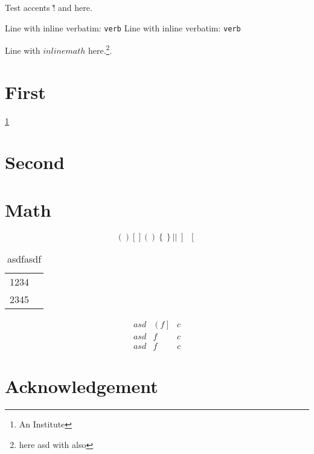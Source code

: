 \documentclass{article}
\begin{document}
Test accents \v! and \v@ here.

Line with inline verbatim: \verb+verb+
Line with inline verbatim: \verb*+verb+

Line with $inline math$ here.\footnote{here {asd} with \cmd also}.

\section{First}
\label{sec:first}

\ref{sec:first}
\pageref{sec:second}
\nocite{bibkey0}
\cite{bibkey1}
\citet*{bibkey2}
\citep{bibkey3}
\citep[e.g.][]{bibkey4}

\section{Second}
\label{sec:second}

\author{A. Author\thanks{An Institute}}

\section{Math}
\label{sec:math}

\begin{equation}
  ( )
  [ ]

  \left( \right)
  \left\{ \right\}
  \left\lvert \right\rvert
  \left] \right[
\end{equation}

\begin{table}
  \centering
  \caption{asdfasdf}
  \label{tab:}
  \begin{tabular}{cr}
    1234 \\
    2345 \\
  \end{tabular}
\end{table}

\begin{equation}
  \begin{array}{ccc}
    asd & \left( f \right] & c \\
    asd & f & c \\
    asd & f & c
  \end{array}
\end{equation}

\section*{Acknowledgement}
\end{document}
